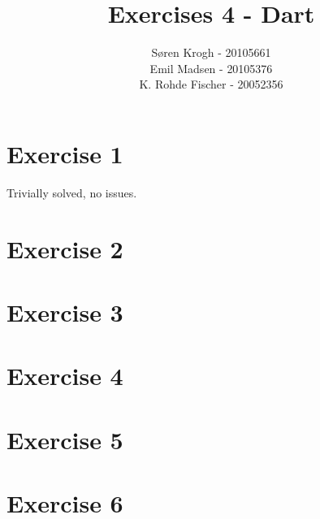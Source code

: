 \documentclass[a4paper,10pt]{article}
\author{
Søren Krogh -  20105661 \\
Emil Madsen - 20105376  \\
K. Rohde Fischer - 20052356\\}
\title{Exercises 4 - Dart}
\begin{document}
\maketitle

\section*{Exercise 1}
Trivially solved, no issues.

\section*{Exercise 2}


\section*{Exercise 3}


\section*{Exercise 4}


\section*{Exercise 5}


\section*{Exercise 6}

\end{document}
